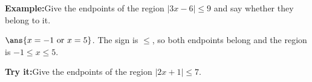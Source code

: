 \documentclass[12pt]{article}
\begin{document}
\begin{examplebox}
\textbf{Example:}\quad Give the endpoints of the region $|3x - 6| \le 9$ and say
whether they belong to it.



$\ans{x = -1 \text{ or } x = 5}$. The sign is $\le$, so both endpoints belong and
the region is $-1 \le x \le 5$.
\end{examplebox}

\begin{tryitbox}
\textbf{Try it:}\quad Give the endpoints of the region $|2x + 1| \le 7$.

\end{tryitbox}
\end{document}
